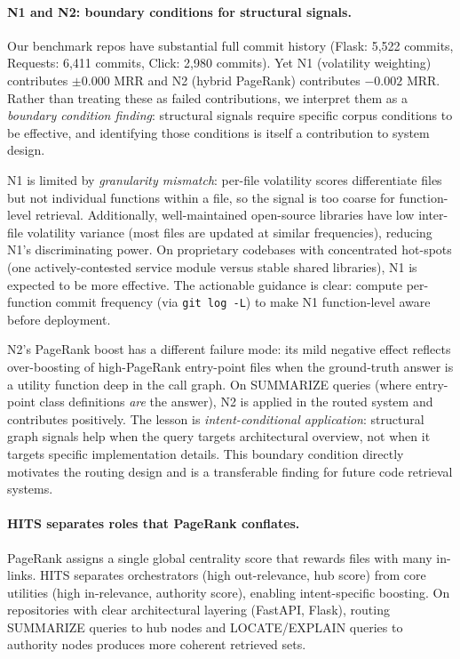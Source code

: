 \documentclass[runningheads]{llncs}
\begin{document}
\paragraph{N1 and N2: boundary conditions for structural signals.}
Our benchmark repos have substantial full commit history (Flask: 5,522
commits, Requests: 6,411 commits, Click: 2,980 commits). Yet N1
(volatility weighting) contributes $\pm$0.000 MRR and N2
(hybrid PageRank) contributes $-0.002$ MRR. Rather than treating
these as failed contributions, we interpret them as a \emph{boundary
condition finding}: structural signals require specific corpus
conditions to be effective, and identifying those conditions is
itself a contribution to system design.

N1 is limited by \emph{granularity mismatch}: per-file volatility
scores differentiate files but not individual functions within a
file, so the signal is too coarse for function-level retrieval.
Additionally, well-maintained open-source libraries have low
inter-file volatility variance (most files are updated at similar
frequencies), reducing N1's discriminating power. On proprietary
codebases with concentrated hot-spots (one actively-contested
service module versus stable shared libraries), N1 is expected to
be more effective. The actionable guidance is clear: compute
per-function commit frequency (via \texttt{git log -L}) to make N1
function-level aware before deployment.

N2's PageRank boost has a different failure mode: its mild negative
effect reflects over-boosting of high-PageRank entry-point files
when the ground-truth answer is a utility function deep in the
call graph. On SUMMARIZE queries (where entry-point class definitions
\emph{are} the answer), N2 is applied in the routed system and
contributes positively. The lesson is \emph{intent-conditional
application}: structural graph signals help when the query targets
architectural overview, not when it targets specific implementation
details. This boundary condition directly motivates the routing
design and is a transferable finding for future code retrieval systems.

\paragraph{HITS separates roles that PageRank conflates.}
PageRank assigns a single global centrality score that rewards
files with many in-links. HITS separates orchestrators (high
out-relevance, hub score) from core utilities (high in-relevance,
authority score), enabling intent-specific boosting. On repositories
with clear architectural layering (FastAPI, Flask), routing
SUMMARIZE queries to hub nodes and LOCATE/EXPLAIN queries to
authority nodes produces more coherent retrieved sets.
\end{document}
